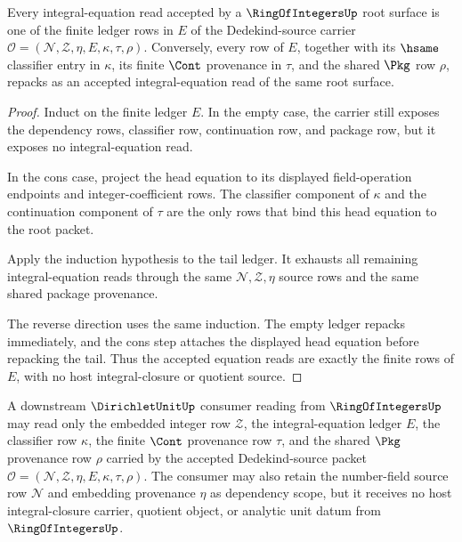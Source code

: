 \begin{theorem}
\label{thm:ringofintegers-integral-equation-ledger-exhaustion}
Every integral-equation read accepted by a $\RingOfIntegersUp$ root surface is
one of the finite ledger rows in $E$ of the Dedekind-source carrier
$\mathcal O=(\mathcal N,\mathcal Z,\eta,E,\kappa,\tau,\rho)$. Conversely, every
row of $E$, together with its $\hsame$ classifier entry in $\kappa$, its finite
$\Cont$ provenance in $\tau$, and the shared $\Pkg$ row $\rho$, repacks as an
accepted integral-equation read of the same root surface.
\end{theorem}
\begin{proof}
Induct on the finite ledger $E$. In the empty case, the carrier still exposes
the dependency rows, classifier row, continuation row, and package row, but it
exposes no integral-equation read.

In the cons case, project the head equation to its displayed field-operation
endpoints and integer-coefficient rows. The classifier component of $\kappa$
and the continuation component of $\tau$ are the only rows that bind this head
equation to the root packet.

Apply the induction hypothesis to the tail ledger. It exhausts all remaining
integral-equation reads through the same $\mathcal N,\mathcal Z,\eta$ source
rows and the same shared package provenance.

The reverse direction uses the same induction. The empty ledger repacks
immediately, and the cons step attaches the displayed head equation before
repacking the tail. Thus the accepted equation reads are exactly the finite
rows of $E$, with no host integral-closure or quotient source.
\end{proof}
\begin{theorem}
\label{thm:ringofintegers-dirichletunit-source-readback}
A downstream $\DirichletUnitUp$ consumer reading from
$\RingOfIntegersUp$ may read only the embedded integer row $\mathcal Z$, the
integral-equation ledger $E$, the classifier row $\kappa$, the finite $\Cont$
provenance row $\tau$, and the shared $\Pkg$ provenance row $\rho$ carried by
the accepted Dedekind-source packet
$\mathcal O=(\mathcal N,\mathcal Z,\eta,E,\kappa,\tau,\rho)$. The consumer may
also retain the number-field source row $\mathcal N$ and embedding provenance
$\eta$ as dependency scope, but it receives no host integral-closure carrier,
quotient object, or analytic unit datum from $\RingOfIntegersUp$.
\end{theorem}
